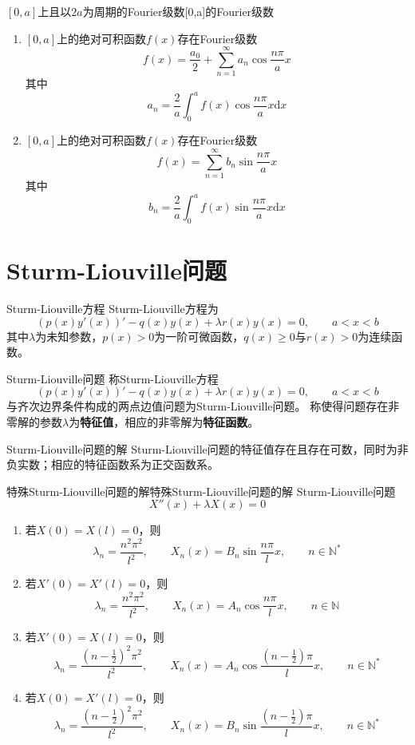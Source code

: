 \documentclass[lang = cn, scheme = chinese, thmcnt = section]{elegantbook}
\newcommand{\N}{\mathbb{N}}            %
\newcommand{\dd}{\mathrm{d}}           %
\begin{document}
\begin{theorem}{$[0,a]$上且以$2a$为周期的Fourier级数}{[0,a]的Fourier级数}
	\begin{enumerate}
		\item $[0,a]$上的绝对可积函数$f(x)$存在Fourier级数
		$$
		f(x)=\frac{a_0}{2}+\sum_{n=1}^{\infty}a_n\cos \frac{n\pi}{a}x
		$$
		其中%
		$$
		a_n=\frac{2}{a}\int_{0}^{a}f(x)\cos \frac{n\pi}{a} x\dd x
		$$
		\item $[0,a]$上的绝对可积函数$f(x)$存在Fourier级数
		$$
		f(x)=\sum_{n=1}^{\infty}b_n\sin \frac{n\pi}{a}x
		$$
		其中%
		$$
		b_n=\frac{2}{a}\int_{0}^{a}f(x)\sin \frac{n\pi}{a} x\dd x
		$$
	\end{enumerate}
\end{theorem}

\section{Sturm-Liouville问题}

\begin{definition}{Sturm-Liouville方程}
	Sturm-Liouville方程为
	$$
	(p(x)y'(x))'-q(x)y(x)+\lambda r(x)y(x)=0,\qquad a<x<b
	$$
	其中$\lambda$为未知参数，$p(x)>0$为一阶可微函数，$q(x)\ge 0$与$r(x)>0$为连续函数。
\end{definition}

\begin{definition}{Sturm-Liouville问题}
	称Sturm-Liouville方程
	$$
	(p(x)y'(x))'-q(x)y(x)+\lambda r(x)y(x)=0,\qquad a<x<b
	$$
	与齐次边界条件构成的两点边值问题为Sturm-Liouville问题。
	称使得问题存在非零解的参数$\lambda$为{\bf 特征值}，相应的非零解为{\bf 特征函数}。
\end{definition}

\begin{theorem}{Sturm-Liouville问题的解}
	Sturm-Liouville问题的特征值存在且存在可数，同时为非负实数；相应的特征函数系为正交函数系。
\end{theorem}

\begin{theorem}{特殊Sturm-Liouville问题的解}{特殊Sturm-Liouville问题的解}
	Sturm-Liouville问题%
	\begin{equation}
		X''(x)+\lambda X(x)=0
		\label{二阶线性微分方程}
		\tag{*}
	\end{equation}
	\begin{enumerate}
		\item 若$X(0)=X(l)=0$，则
		$$
		\lambda_n=\frac{n^2\pi^2}{l^2},\qquad 
		X_n(x)=B_n\sin\frac{n\pi}{l}x,\qquad n\in\N^*
		$$
		\item 若$X'(0)=X'(l)=0$，则
		$$
		\lambda_n=\frac{n^2\pi^2}{l^2},\qquad 
		X_n(x)=A_n\cos\frac{n\pi}{l}x,\qquad n\in\N
		$$
		\item 若$X'(0)=X(l)=0$，则
		$$
		\lambda_n=\frac{\left(n-\frac{1}{2}\right)^2\pi^2}{l^2},\qquad 
		X_n(x)=A_n\cos\frac{\left(n-\frac{1}{2}\right)\pi}{l}x,\qquad n\in\N^*
		$$
		\item 若$X(0)=X'(l)=0$，则
		$$
		\lambda_n=\frac{\left(n-\frac{1}{2}\right)^2\pi^2}{l^2},\qquad 
		X_n(x)=B_n\sin\frac{\left(n-\frac{1}{2}\right)\pi}{l}x,\qquad n\in\N^*
		$$
	\end{enumerate}
\end{theorem}
\end{document}
